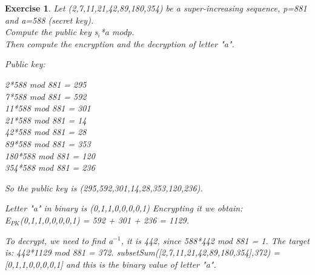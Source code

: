 \documentclass[a4paper, 12pt]{report}
\newtheorem{exercise}{\textbf{Exercise}}
\begin{document}
\begin{exercise}
	Let (2,7,11,21,42,89,180,354) be a super-increasing sequence, p=881 and a=588 (secret key).\\
	Compute the public key s$_i$*a mod\textit{p}.\\
	Then compute the encryption and the decryption of letter "a".
	
	Public key:
	\begin{center}
		2*588 mod 881 = 295\\
		7*588 mod 881 = 592\\
		11*588 mod 881 = 301\\
		21*588 mod 881 = 14\\
		42*588 mod 881 = 28\\
		89*588 mod 881 = 353\\
		180*588 mod 881 = 120\\
		354*588 mod 881 = 236\\
	\end{center}
	So the public key is (295,592,301,14,28,353,120,236).
	
	Letter "a" in binary is (0,1,1,0,0,0,0,1)
	Encrypting it we obtain:\\
	E$_{PK}$(0,1,1,0,0,0,0,1) = 592 + 301 + 236 = 1129.
	
	To decrypt, we need to find a$^{-1}$, it is 442, since 588*442 mod 881 = 1.
	The target is: 442*1129 mod 881 = 372.
	subsetSum([2,7,11,21,42,89,180,354],372) = [0,1,1,0,0,0,0,1] and this is the binary value of letter "a". 
	
\end{exercise}
\end{document}
